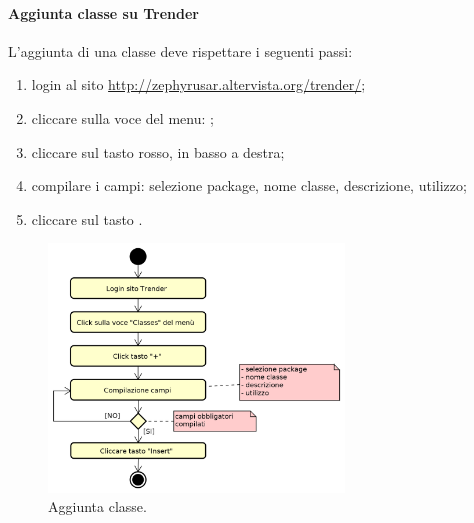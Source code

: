 		\paragraph{Aggiunta classe su Trender}
		L'aggiunta di una classe deve rispettare i seguenti passi:
		\begin{enumerate}
			\item login al sito \url{http://zephyrusar.altervista.org/trender/};
			\item cliccare sulla voce del menu: ;
			\item cliccare sul tasto \hicode{+} rosso, in basso a destra;
			\item compilare i campi: selezione package, nome classe, descrizione, utilizzo;
			\item cliccare sul tasto .
		\end{enumerate}
		\begin{figure}[H]
			\centering
			\includegraphics[width=0.7\textwidth]{img/AggiuntaClasse}
			\caption{Aggiunta classe.}
		\end{figure}
		
